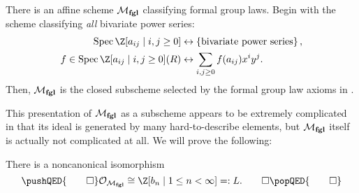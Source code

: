 \begin{definition}\label{MfglDefn}
There is an affine scheme $\mathcal{M}_{\mathbf{fgl}}$ classifying formal group laws.  Begin with the scheme classifying \emph{all} bivariate power series:
\begin{align*}
\Spec \Z[a_{ij} \mid i, j \ge 0] & \leftrightarrow \left\{ \text{bivariate power series} \right\}, \\
f \in \Spec\Z[a_{ij} \mid i, j \ge 0](R) & \leftrightarrow \sum_{i, j \ge 0} f(a_{ij}) x^i y^j.
\end{align*}
Then, $\mathcal{M}_{\mathbf{fgl}}$ is the closed subscheme selected by the formal group law axioms in .
\end{definition}

This presentation of $\mathcal{M}_{\mathbf{fgl}}$ as a subscheme appears to be extremely complicated in that its ideal is generated by many hard-to-describe elements, but $\mathcal{M}_{\mathbf{fgl}}$ itself is actually not complicated at all.  We will prove the following:
\begin{theorem}\label{LazardsTheorem}
There is a noncanonical isomorphism
\[\pushQED{\qed}
\sheaf{O}_{\moduli{fgl}} \cong \Z[b_n \mid 1 \le n < \infty] =: L. \qedhere
\popQED{\qed}\]
\end{theorem}
